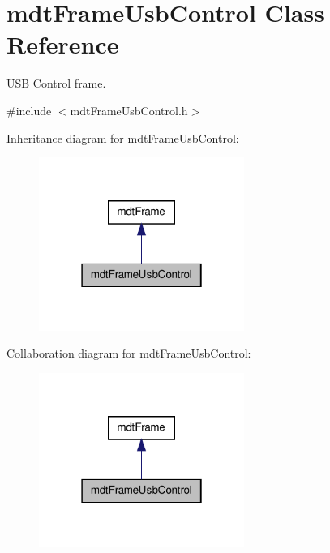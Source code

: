 \hypertarget{classmdt_frame_usb_control}{
\section{mdtFrameUsbControl Class Reference}
\label{classmdt_frame_usb_control}
}


USB Control frame.  




{\ttfamily \#include $<$mdtFrameUsbControl.h$>$}



Inheritance diagram for mdtFrameUsbControl:
\nopagebreak
\begin{figure}[H]
\begin{center}
\leavevmode
\includegraphics[width=190pt]{classmdt_frame_usb_control__inherit__graph}
\end{center}
\end{figure}


Collaboration diagram for mdtFrameUsbControl:
\nopagebreak
\begin{figure}[H]
\begin{center}
\leavevmode
\includegraphics[width=190pt]{classmdt_frame_usb_control__coll__graph}
\end{center}
\end{figure}
